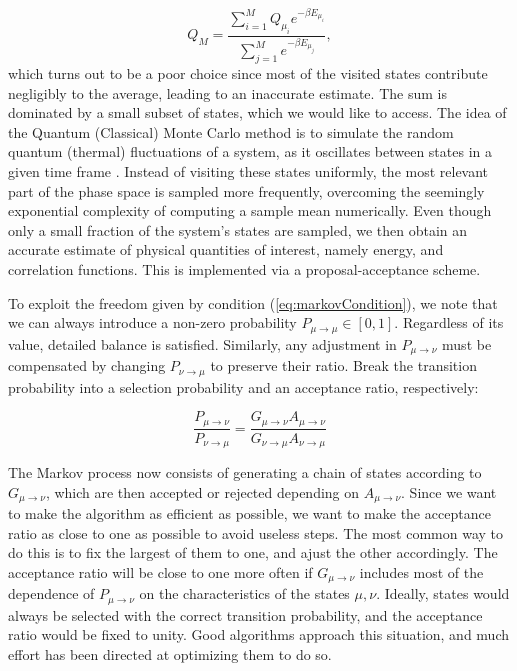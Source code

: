 \begin{equation}
Q_M = \frac{ \sum_{i=1}^M Q_{\mu_i} e^{ -\beta E_{\mu_i} } }{ \sum_{j=1}^M e^{ -\beta E_{\mu_j} }  } ,
\end{equation}
which turns out to be a poor choice since most of the visited states contribute negligibly to the average, leading to an inaccurate estimate.
The sum is dominated by a small subset of states, which we would like to access.
The idea of the Quantum (Classical) Monte Carlo method is to simulate the random quantum (thermal) fluctuations of a system, as it oscillates between states in a given time frame \cite{newman_monte_1999}. Instead of visiting these states uniformly, the most relevant part of the phase space is sampled more frequently, overcoming the seemingly exponential complexity of computing a sample mean numerically.
Even though only a small fraction of the system's states are sampled, we then obtain an accurate estimate of physical quantities of interest, namely energy, and correlation functions. This is implemented via a proposal-acceptance scheme.

To exploit the freedom given by condition (\ref{eq:markovCondition}), we note that we can always introduce a non-zero  probability $P_{\mu \rightarrow \mu} \in [0, 1] $.
Regardless of its value, detailed balance is satisfied.
Similarly, any adjustment in $P_{\mu\rightarrow \nu}$ must be compensated by changing $P_{\nu\rightarrow \mu}$ to preserve their ratio.
Break the transition probability into a selection probability and an acceptance ratio, respectively:

\begin{equation}
\frac{P_{\mu\rightarrow\nu}}{P_{\nu\rightarrow\mu}}= \frac{G_{ \mu\rightarrow\nu} A_{\mu\rightarrow\nu}}{G_{ \nu\rightarrow\mu} A_{\nu\rightarrow\mu}}
\end{equation}

The Markov process now consists of generating a chain of states according to $G_{ \mu\rightarrow\nu}$, which are then accepted or rejected depending on $A_{\mu\rightarrow\nu}$.
Since we want to make the algorithm as efficient as possible, we want to make the acceptance ratio as close to one as possible to avoid useless steps.	
The most common way to do this is to fix the largest of them to one, and ajust the other accordingly.
The acceptance ratio will be close to one more often if $G_{ \mu\rightarrow\nu}$ includes most of the dependence of $P_{\mu\rightarrow\nu}$ on the characteristics of the states $\mu, \nu$.
Ideally, states would always be selected with the correct transition probability, and the acceptance ratio would be fixed to unity.
Good algorithms approach this situation, and much effort has been directed at optimizing them to do so.

